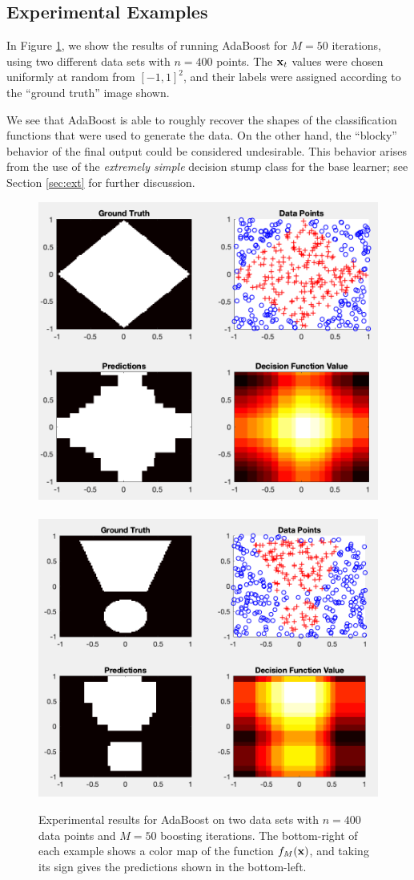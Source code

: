 \documentclass[english]{article}
\begin{document}
\subsection{Experimental Examples}

In Figure \ref{fig:exp}, we show the results of running AdaBoost for $M=50$ iterations, using two different data sets with $n=400$ points.  The $\mathbf{x}_t$ values were chosen uniformly at random from $[-1,1]^2$, and their labels were assigned according to the ``ground truth'' image shown.

We see that AdaBoost is able to roughly recover the shapes of the classification functions that were used to generate the data.  On the other hand, the ``blocky'' behavior of the final output could be considered undesirable.  This behavior arises from the use of the {\em extremely simple} decision stump class for the base learner; see Section \ref{sec:ext} for further discussion. 

    \begin{figure}
        \centering
        \includegraphics[width=.43\textwidth]{BoostingExp1} ~~~~~
        \includegraphics[width=.46\textwidth]{BoostingExp2}
        \par
        \caption{Experimental results for AdaBoost on two data sets with $n=400$ data points and $M=50$ boosting iterations.  The bottom-right of each example shows a color map of the function $f_M(\mathbf{x})$, and taking its sign gives the predictions shown in the bottom-left. \label{fig:exp}}
    \end{figure}  
\end{document}
